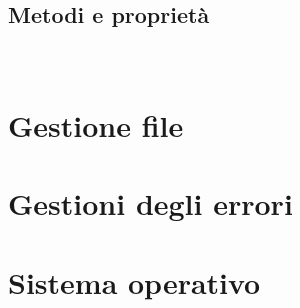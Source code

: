 \documentclass{report}
\begin{document}
\section{Metodi e proprietà}
\\


\chapter{Gestione file} %
\label{chap:Gestione file}


\chapter{Gestioni degli errori} %
\label{chap:Gestioni degli errori}


\chapter{Sistema operativo} %
\label{chap:Sistema operativo}

\end{document}
